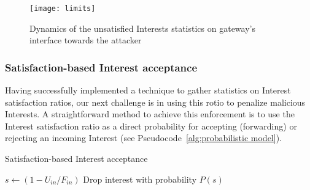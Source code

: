 \begin{figure}[htbp]
  \centering
  \texttt{[image: limits]}
  \vspace{-0.3cm}
  \caption{Dynamics of the unsatisfied Interests statistics on gateway's interface towards the attacker}
  \label{fig:ratio example}
\end{figure}


\subsubsection{\textbf{Satisfaction-based Interest acceptance}}
\label{sec:probabilistic}

Having successfully implemented a technique to gather statistics on Interest satisfaction ratios, our next challenge is in using this rotio to penalize malicious Interests. A straightforward method to achieve this enforcement is to use the Interest satisfaction ratio as a direct probability for accepting (forwarding) or rejecting an incoming Interest (see Pseudocode~\ref{alg:probabilistic model}).




\begin{algorithm}[h]
\footnotesize
\caption{\small Satisfaction-based Interest acceptance}
\label{alg:probabilistic model}
\begin{algorithmic}[1]
\State{} 

\vspace{0.1cm}

    \State{} 
    \State{} 
    
     
        \State $s \leftarrow (1 - U_{in} / F_{in})$
        \State Drop interest with probability $P(s)$
    \EndIf

\EndFunction

\end{algorithmic}
\end{algorithm}

